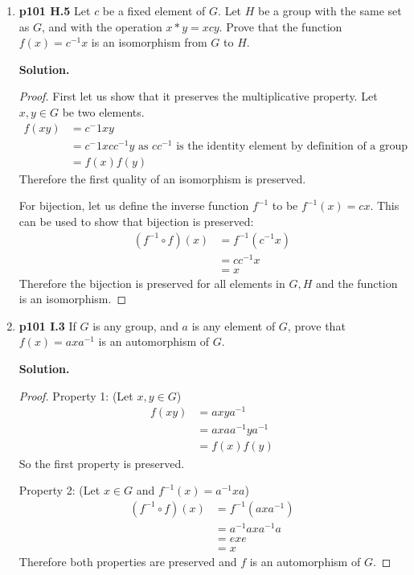 \documentclass[11pt]{article}
\begin{document}
\begin{enumerate}
\begin{proof}
          Therefore both properties of an isomorphism are preserved and the composition is an isomorphism.
	\end{proof}

\item {\bfseries p101 H.5} Let $c$ be a fixed element of $G$. Let $H$ be a group with the same set as $G$, and with the operation $x * y = xcy$. Prove that the function $f(x) = c^{-1}x$ is an isomorphism from $G$ to $H$.
  
	{\bfseries Solution.}
	\begin{proof}
		First let us show that it preserves the multiplicative property. Let $x, y \in G$ be two elements. 
		\begin{align*}
			f(xy) &= c^-1xy \\
			&= c^-1xcc^{-1}y \text{ as $cc^{-1}$ is the identity element by definition of a group} \\
			&= f(x)f(y) 
		\end{align*}
		Therefore the first quality of an isomorphism is preserved.
      
		For bijection, let us define the inverse function $f^{-1}$ to be $f^{-1}(x) = cx$.
		This can be used to show that bijection is preserved:
		\begin{align*}
			(f^{-1} \circ f)(x) &= f^{-1}(c^{-1}x) \\
			&= cc^{-1}x \\
			&= x
		\end{align*}
		Therefore the bijection is preserved for all elements in $G,H$ and the function is an isomorphism.
	\end{proof}

\item {\bfseries p101 I.3} If $G$ is any group, and $a$ is any element of $G$, prove that $f(x) = axa^{-1}$ is an automorphism of $G$.
  
	{\bfseries Solution.}
	\begin{proof}
		Property 1: (Let $x,y \in G$)
		\begin{align*}
			f(xy) &= axya^{-1} \\
			&= axaa^{-1}ya^{-1} \\
			&= f(x)f(y)
		\end{align*}
		So the first property is preserved.
		
		Property 2: (Let $x \in G$ and $f^{-1}(x) = a^{-1}xa$)
		\begin{align*}
			(f^{-1} \circ f)(x) &= f^{-1}(axa^{-1}) \\
			&= a^{-1}axa^{-1}a \\
			&= exe \\
			&= x
          \end{align*}
		Therefore both properties are preserved and $f$ is an automorphism of $G$.
	\end{proof}

\end{enumerate}
\end{document}
